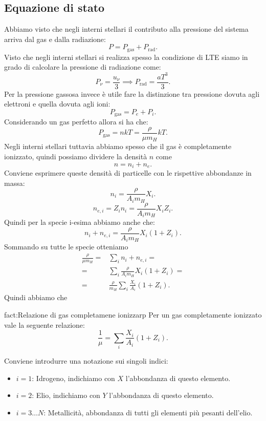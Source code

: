 \subsection{Equazione di stato}
\label{subsec:Equazione di stato}
Abbiamo visto che negli interni stellari il contributo alla pressione del sistema arriva dal gas e dalla radiazione:
\[
	P = P_\text{gas} + P_\text{rad} 
.\] 
Visto che negli interni stellari si realizza spesso la condizione di LTE siamo in grado di calcolare la pressione di radiazione come:
\[
	P_{\nu} = \frac{u_{\nu} }{3}\implies P_\text{rad} = \frac{aT^3}{3}
.\] 
Per la pressione gassosa invece è utile fare la distinzione tra pressione dovuta agli elettroni e quella dovuta agli ioni:
\[
	P_\text{gas} = P_e + P_i
.\] 
Considerando un gas perfetto allora si ha che:
\[
	P_\text{gas} = nkT = \frac{\rho }{\mu m_H}kT
.\] 
Negli interni stellari tuttavia abbiamo spesso che il gas è completamente ionizzato, quindi possiamo dividere la densità $n$ come 
\[
	n = n_i + n_e
.\] 
Conviene esprimere queste densità di particelle con le rispettive abbondanze in massa:
\[
	n_i = \frac{\rho }{A_im_H}X_i
.\] 
\[
	n_{e,i} = Z_in_i = \frac{\rho }{A_im_H}X_i Z_i
.\] 
Quindi per la specie i-esima abbiamo anche che:
\[
	n_i + n_{e,i} = \frac{\rho }{A_im_H}X_i \left( 1 + Z_i \right) 
.\] 
Sommando su tutte le specie otteniamo
\[\begin{aligned}
	\frac{\rho }{\mu m_H}=&
	\sum_{i}^{} n_i + n_{e,i}=\\
	=&
	\sum_{i}^{} \frac{\rho }{A_im_H}X_i\left( 1+Z_i \right) =\\
	=& \frac{\rho }{m_H}\sum_{i}^{} \frac{X_i}{A_i}\left( 1+Z_i \right) 
.\end{aligned}\]
Quindi abbiamo che
\begin{fact}{fact:Relazione di gas completamene ionizzarp}
	Per un gas completamente ionizzato vale la seguente relazione:
	\[
		\frac{1}{\mu} = \sum_{i}^{} \frac{X_i}{A_i} \left( 1 + Z_i \right) 
	.\] 
\end{fact}
Conviene introdurre una notazione sui singoli indici:
\begin{itemize}
	\item $i=1$: Idrogeno, indichiamo con $X$ l'abbondanza di questo elemento.
	\item $i=2$: Elio, indichiamo con $Y$ l'abbondanza di questo elemento.
	\item $i=3\ldots N$: Metallicità, abbondanza di tutti gli elementi più pesanti dell'elio.
\end{itemize}
